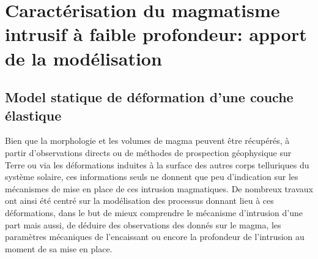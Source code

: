 \section{Caractérisation du  magmatisme intrusif à  faible profondeur:
  apport de la modélisation}
\label{sec:orign-theor-fram}

\subsection{Model statique de déformation d'une couche élastique}
\label{sec:model-statique-de}

Bien  que  la  morphologie  et  les  volumes  de  magma  peuvent  être
récupérés,  à   partir  d'observations  directs  ou   de  méthodes  de
prospection géophysique sur  Terre ou via les  déformations induites à
la  surface  des autres  corps  telluriques  du système  solaire,  ces
informations seuls ne donnent que  peu d'indication sur les mécanismes
de mise  en place de  ces intrusion magmatiques.  De  nombreux travaux
ont ainsi été centré sur la  modélisation des processus donnant lieu à
ces  déformations,  dans  le  but de  mieux  comprendre  le  mécanisme
d'intrusion d'une  part mais  aussi, de  déduire des  observations des
donnés  sur le  magma, les  paramètres mécaniques  de l'encaissant  ou
encore la profondeur de l'intrusion au moment de sa mise en place.


